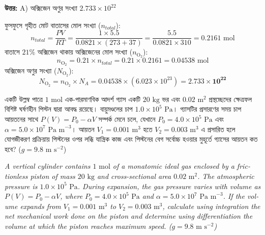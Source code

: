 \documentclass[12pt, a4paper]{article}
\begin{document}
\vspace{0.5em}
\begin{tcolorbox}[answerbox]
    \textbf{\color{success} উত্তর:} A) অক্সিজেন অণুর সংখ্যা $2.733 \times 10^{22}$
\end{tcolorbox}
\vspace{1em}

\begin{tcolorbox}[solutionbox={সমাধান (Solution)}]
    \noindent
    ফুসফুসে গৃহীত মোট বাতাসের মোল সংখ্যা ($n_{total}$):
    \[ n_{total} = \frac{P V}{R T} = \frac{1 \times 5.5}{0.0821 \times (273 + 37)} = \frac{5.5}{0.0821 \times 310} = 0.2161\text{ mol} \]
    বাতাসে $21\%$ অক্সিজেন থাকায় অক্সিজেনের মোল সংখ্যা ($n_{\text{O}_2}$):
    \[ n_{\text{O}_2} = 0.21 \times n_{total} = 0.21 \times 0.2161 = 0.04538\text{ mol} \]
    অক্সিজেন অণুর সংখ্যা ($N_{\text{O}_2}$):
    \[ N_{\text{O}_2} = n_{\text{O}_2} \times N_A = 0.04538 \times (6.023 \times 10^{23}) = \mathbf{2.733 \times 10^{22}} \]
\end{tcolorbox}
\vspace{2em}

\begin{tcolorbox}[questionbox={প্রশ্ন (Question) 10}]
    \noindent
    একটি উল্লম্ব পাত্রে $1\text{ mol}$ এক-পারমাণবিক আদর্শ গ্যাস একটি $20\text{ kg}$ ভর এবং $0.02\text{ m}^2$ প্রস্থচ্ছেদের ক্ষেত্রফল বিশিষ্ট ঘর্ষণহীন পিস্টন দ্বারা আবদ্ধ রয়েছে। বায়ুমণ্ডলের চাপ $1.0 \times 10^5\text{ Pa}$। গ্যাসটির প্রসারণের সময় চাপ আয়তনের সাথে $P(V) = P_0 - \alpha V$ সম্পর্ক মেনে চলে, যেখানে $P_0 = 4.0 \times 10^5\text{ Pa}$ এবং $\alpha = 5.0 \times 10^7\text{ Pa m}^{-3}$। আয়তন $V_1 = 0.001\text{ m}^3$ হতে $V_2 = 0.003\text{ m}^3$ এ প্রসারিত হলে যোগজীকরণ প্রক্রিয়ায় পিস্টনের ওপর লব্ধি যান্ত্রিক কাজ এবং পিস্টনের বেগ সর্বোচ্চ হওয়ার মুহূর্তে গ্যাসের আয়তন কত হবে? ($g = 9.8\text{ m s}^{-2}$)
    
    \vspace{0.8em}
    \begin{english}
    \noindent\textit{\color{darkgray}
    A vertical cylinder contains $1\text{ mol}$ of a monatomic ideal gas enclosed by a frictionless piston of mass $20\text{ kg}$ and cross-sectional area $0.02\text{ m}^2$. The atmospheric pressure is $1.0 \times 10^5\text{ Pa}$. During expansion, the gas pressure varies with volume as $P(V) = P_0 - \alpha V$, where $P_0 = 4.0 \times 10^5\text{ Pa}$ and $\alpha = 5.0 \times 10^7\text{ Pa m}^{-3}$. If the volume expands from $V_1 = 0.001\text{ m}^3$ to $V_2 = 0.003\text{ m}^3$, calculate using integration the net mechanical work done on the piston and determine using differentiation the volume at which the piston reaches maximum speed. ($g = 9.8\text{ m s}^{-2}$)
    }
    \end{english}
\end{tcolorbox}
\end{document}
